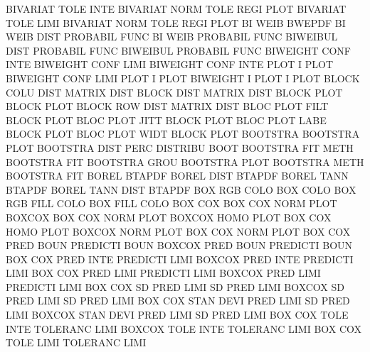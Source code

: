BIVARIAT TOLE INTE                      BIVARIAT NORM TOLE REGI PLOT
BIVARIAT TOLE LIMI                      BIVARIAT NORM TOLE REGI PLOT
BI       WEIB                           BWEPDF
BI       WEIB DIST                      PROBABIL FUNC
BI       WEIB                           PROBABIL FUNC
BIWEIBUL DIST                           PROBABIL FUNC
BIWEIBUL                                PROBABIL FUNC
BIWEIGHT CONF INTE                      BIWEIGHT CONF LIMI
BIWEIGHT CONF INTE PLOT                 I        PLOT
BIWEIGHT CONF LIMI PLOT                 I        PLOT
BIWEIGHT I    PLOT                      I        PLOT
BLOCK    COLU DIST                      MATRIX   DIST
BLOCK    DIST                           MATRIX   DIST
BLOCK    PLOT                           BLOCK    PLOT
BLOCK    ROW  DIST                      MATRIX   DIST
BLOC     PLOT FILT                      BLOCK    PLOT
BLOC     PLOT JITT                      BLOCK    PLOT
BLOC     PLOT LABE                      BLOCK    PLOT
BLOC     PLOT WIDT                      BLOCK    PLOT
BOOTSTRA                                BOOTSTRA PLOT
BOOTSTRA DIST PERC                      DISTRIBU BOOT
BOOTSTRA FIT  METH                      BOOTSTRA FIT
BOOTSTRA GROU                           BOOTSTRA PLOT
BOOTSTRA METH                           BOOTSTRA FIT
BOREL                                   BTAPDF
BOREL    DIST                           BTAPDF
BOREL    TANN                           BTAPDF
BOREL    TANN DIST                      BTAPDF
BOX      RGB  COLO                      BOX      COLO
BOX      RGB  FILL COLO                 BOX      FILL COLO
BOX      COX                            BOX      COX  NORM PLOT
BOXCOX                                  BOX      COX  NORM PLOT
BOXCOX   HOMO PLOT                      BOX      COX  HOMO PLOT
BOXCOX   NORM PLOT                      BOX      COX  NORM PLOT
BOX      COX  PRED BOUN                 PREDICTI BOUN
BOXCOX   PRED BOUN                      PREDICTI BOUN
BOX      COX  PRED INTE                 PREDICTI LIMI
BOXCOX   PRED INTE                      PREDICTI LIMI
BOX      COX  PRED LIMI                 PREDICTI LIMI
BOXCOX   PRED LIMI                      PREDICTI LIMI
BOX      COX  SD   PRED LIMI            SD       PRED LIMI
BOXCOX   SD   PRED LIMI                 SD       PRED LIMI
BOX      COX  STAN DEVI PRED LIMI       SD       PRED LIMI
BOXCOX   STAN DEVI PRED LIMI            SD       PRED LIMI
BOX      COX  TOLE INTE                 TOLERANC LIMI
BOXCOX   TOLE INTE                      TOLERANC LIMI
BOX      COX  TOLE LIMI                 TOLERANC LIMI
